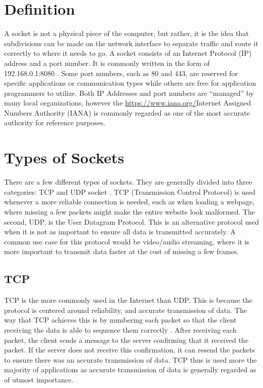 \documentclass[conference, 12pt]{IEEEtran}
\begin{document}
\section{Definition}
A socket is not a physical piece of the computer, but rather, it is the idea that subdivisions can be made on the network interface to separate traffic and route it correctly to where it needs to go. A socket consists of an Internet Protocol (IP) address and a port number. It is commonly written in the form of 192.168.0.1:8080 \cite{Goralski}. Some port numbers, such as 80 and 443, are reserved for specific applications or communication types while others are free for application programmers to utilize. Both IP Addresses and port numbers are “managed” by many local organizations, however the \url{https://www.iana.org/}{Internet Assigned Numbers Authority} (IANA) is commonly regarded as one of the most accurate authority for reference purposes.

\section{Types of Sockets}
There are a few different types of sockets. They are generally divided into three categories: TCP and UDP socket \cite{Sawant}. TCP (Transmission Control Protocol) is used whenever a more reliable connection is needed, such as when loading a webpage, where missing a few packets might make the entire website look malformed. The second, UDP, is the User Datagram Protocol. This is an alternative protocol used when it is not as important to ensure all data is transmitted accurately. A common use case for this protocol would be video/audio streaming, where it is more important to transmit data faster at the cost of missing a few frames.

\subsection{TCP}
TCP is the more commonly used in the Internet than UDP. This is because the protocol is centered around reliability, and accurate transmission of data. The way that TCP achieves this is by numbering each packet so that the client receiving the data is able to sequence them correctly \cite{Hoffman}. After receiving each packet, the client sends a message to the server confirming that it received the packet. If the server does not receive this confirmation, it can resend the packets to ensure there was an accurate transmission of data. TCP thus is used more the majority of applications as accurate transmission of data is generally regarded as of utmost importance.
\end{document}
